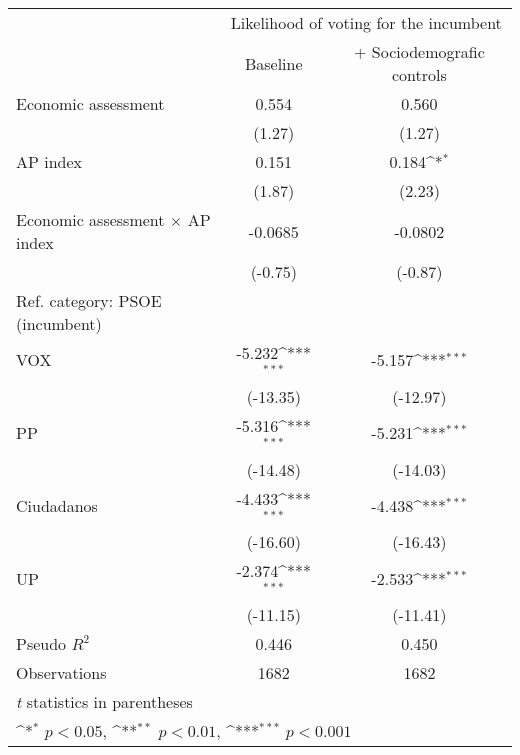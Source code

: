 {
\def\sym#1{\ifmmode^{#1}\else\(^{#1}\)\fi}
\begin{tabular}{l*{2}{c}}
\toprule
                &\multicolumn{2}{c}{Likelihood of voting for the incumbent}\\\cmidrule(lr){2-3}
                & Baseline         &+ Sociodemografic controls         \\
\midrule
Economic assessment&    0.554         &    0.560         \\
                &   (1.27)         &   (1.27)         \\
AP index        &    0.151         &    0.184\sym{*}  \\
                &   (1.87)         &   (2.23)         \\
Economic assessment $\times$ AP index&  -0.0685         &  -0.0802         \\
                &  (-0.75)         &  (-0.87)         \\
Ref. category: PSOE (incumbent)&                  &                  \\
VOX             &   -5.232\sym{***}&   -5.157\sym{***}\\
                & (-13.35)         & (-12.97)         \\
PP              &   -5.316\sym{***}&   -5.231\sym{***}\\
                & (-14.48)         & (-14.03)         \\
Ciudadanos      &   -4.433\sym{***}&   -4.438\sym{***}\\
                & (-16.60)         & (-16.43)         \\
UP              &   -2.374\sym{***}&   -2.533\sym{***}\\
                & (-11.15)         & (-11.41)         \\
\midrule
Pseudo \(R^{2}\)&    0.446         &    0.450         \\
Observations    &     1682         &     1682         \\
\bottomrule
\multicolumn{3}{l}{\footnotesize \textit{t} statistics in parentheses}\\
\multicolumn{3}{l}{\footnotesize \sym{*} \(p<0.05\), \sym{**} \(p<0.01\), \sym{***} \(p<0.001\)}\\
\end{tabular}
}
